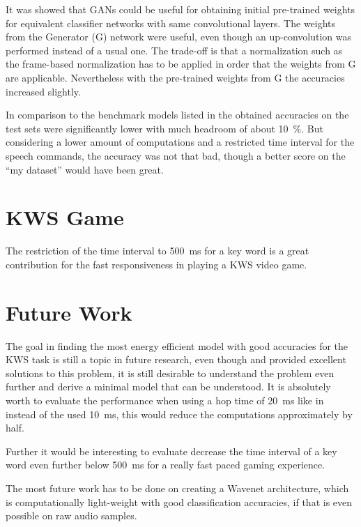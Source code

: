 It was showed that GANs could be useful for obtaining initial pre-trained weights for equivalent classifier networks with same convolutional layers.
The weights from the Generator (G) network were useful, even though an up-convolution was performed instead of a usual one.
The trade-off is that a normalization such as the frame-based normalization has to be applied in order that the weights from G are applicable.
Nevertheless with the pre-trained weights from G the accuracies increased slightly.

In comparison to the benchmark models listed in  the obtained accuracies on the test sets were significantly lower with much headroom of about \SI{10}{\percent}.
But considering a lower amount of computations and a restricted time interval for the speech commands, the accuracy was not that bad, though a better score on the \enquote{my dataset} would have been great.



\section{KWS Game}
\thesisStateNotReady
The restriction of the time interval to \SI{500}{\milli\second} for a key word is a great contribution for the fast responsiveness in playing a KWS video game. 



\section{Future Work}
\thesisStateNotReady
The goal in finding the most energy efficient model with good accuracies for the KWS task is still a topic in future research, even though \cite{Zhang2017} and \cite{Peter2020} provided excellent solutions to this problem, it is still desirable to understand the problem even further and derive a minimal model that can be understood.
It is absolutely worth to evaluate the performance when using a hop time of \SI{20}{\milli\second} like in \cite{Peter2020} instead of the used \SI{10}{\milli\second}, this would reduce the computations approximately by half.

Further it would be interesting to evaluate decrease the time interval of a key word even further below \SI{500}{\milli\second} for a really fast paced gaming experience.

The most future work has to be done on creating a Wavenet architecture, which is computationally light-weight with good classification accuracies, if that is even possible on raw audio samples.

